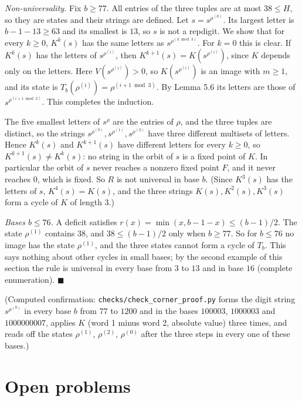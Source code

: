 \documentclass[11pt,letterpaper]{article}
\theoremstyle{paperstyle}
\theoremstyle{paperstyledef}
\theoremstyle{paperstylerem}
\begin{document}
\emph{Non-universality.} Fix \(b \ge 77\). All entries of the three tuples are at most \(38 \le H\), so they are states and their strings are defined. Let \(s = s^{\rho^{(0)}}\). Its largest letter is \(b - 1 - 13 \ge 63\) and its smallest is \(13\), so \(s\) is not a repdigit. We show that for every \(k \ge 0\), \(K^k(s)\) has the same letters as \(s^{\rho^{(k \bmod 3)}}\). For \(k = 0\) this is clear. If \(K^k(s)\) has the letters of \(s^{\rho^{(i)}}\), then \(K^{k+1}(s) = K(s^{\rho^{(i)}})\), since \(K\) depends only on the letters. Here \(V(s^{\rho^{(i)}}) > 0\), so \(K(s^{\rho^{(i)}})\) is an image with \(m \ge 1\), and its state is \(T_b(\rho^{(i)}) = \rho^{(i+1 \bmod 3)}\). By Lemma 5.6 its letters are those of \(s^{\rho^{(i+1 \bmod 3)}}\). This completes the induction.

The five smallest letters of \(s^{\rho}\) are the entries of \(\rho\), and the three tuples are distinct, so the strings \(s^{\rho^{(0)}}, s^{\rho^{(1)}}, s^{\rho^{(2)}}\) have three different multisets of letters. Hence \(K^k(s)\) and \(K^{k+1}(s)\) have different letters for every \(k \ge 0\), so \(K^{k+1}(s) \ne K^k(s)\): no string in the orbit of \(s\) is a fixed point of \(K\). In particular the orbit of \(s\) never reaches a nonzero fixed point \(F\), and it never reaches \(0\), which is fixed. So \(R\) is not universal in base \(b\). (Since \(K^3(s)\) has the letters of \(s\), \(K^4(s) = K(s)\), and the three strings \(K(s), K^2(s), K^3(s)\) form a cycle of \(K\) of length \(3\).)

\emph{Bases \(b \le 76\).} A deficit satisfies \(r(x) = \min(x, b-1-x) \le (b-1)/2\). The state \(\rho^{(1)}\) contains \(38\), and \(38 \le (b-1)/2\) only when \(b \ge 77\). So for \(b \le 76\) no image has the state \(\rho^{(1)}\), and the three states cannot form a cycle of \(T_b\). This says nothing about other cycles in small bases; by the second example of this section the rule is universal in every base from \(3\) to \(13\) and in base \(16\) (complete enumeration). \(\blacksquare\)

(Computed confirmation: \texttt{checks/check\_corner\_proof.py} forms the digit string \(s^{\rho^{(0)}}\) in every base \(b\) from \(77\) to \(1200\) and in the bases \(100003\), \(1000003\) and \(1000000007\), applies \(K\) (word 1 minus word 2, absolute value) three times, and reads off the states \(\rho^{(1)}\), \(\rho^{(2)}\), \(\rho^{(0)}\) after the three steps in every one of these bases.)

\section{Open problems}\label{open-problems}
\end{document}
